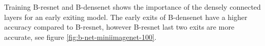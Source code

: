 
Training B-\gls{resnet} and B-\gls{densenet} shows the importance of the densely connected layers for an early exiting model. The early exits of B-\gls{densenet} have a higher accuracy compared to B-\gls{resnet}, however B-\gls{resnet} last two exits are more accurate, see figure \ref{fig:b-net-miniimagenet-100}. 

\begin{figure}
	\centering
	\captionsetup[subfigure]{justification=centering}
\end{figure}

